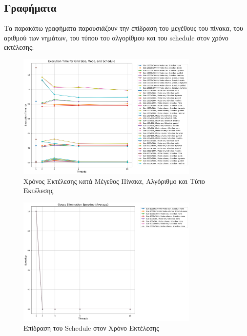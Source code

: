 \documentclass{article}
\begin{document}
\subsection*{Γραφήματα} Τα παρακάτω γραφήματα παρουσιάζουν την επίδραση του μεγέθους του πίνακα, του αριθμού των νημάτων, του τύπου του αλγορίθμου και του schedule στον χρόνο εκτέλεσης:
\newpage
\begin{figure}[h] 
    \centering 
    \includegraphics[width=0.8\textwidth]{gauss_elimination_results.png} 
    \caption{Χρόνος Εκτέλεσης κατά Μέγεθος Πίνακα, Αλγόριθμο και Τύπο Εκτέλεσης} 
\end{figure}
\newpage
\begin{figure}[h] 
    \centering 
    \includegraphics[width=0.8\textwidth]{gauss_elimination_speedup.png} 
    \caption{Επίδραση του Schedule στον Χρόνο Εκτέλεσης} 
\end{figure}
\end{document}
